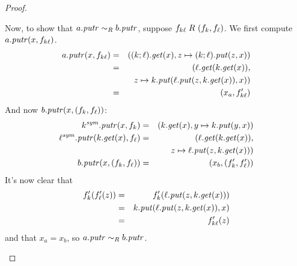 \begin{defn}[$R$-similarity]
\begin{theorem}
\begin{lemma}
\begin{theorem}[No products]
\begin{lemma}
\begin{defn}
\begin{theorem}
\begin{theorem}
\begin{corollary}[Hylomorphism]
\begin{defn}
\begin{defn}
\begin{defn}[Symmetrization]
\begin{proof}
\begin{longenum}
Now, to show that $a.\mathit{putr} \sim_R b.\mathit{putr}$, suppose
$f_{k\ell}\mathrel{R_{}}(f_k,f_\ell)$. We first compute $a.\mathit{putr}(x,f_{k\ell})$.
\begin{eqnarray*}
    a.\mathit{putr}(x,f_{k\ell}) &=& ((k;\ell).\mathit{get}(x),z \mapsto (k;\ell).\mathit{put}(z,x)) \\
    &=& (\ell.\mathit{get}(k.\mathit{get}(x)), \\
    & & z \mapsto k.\mathit{put}(\ell.\mathit{put}(z,k.\mathit{get}(x)),x)) \\
    &=& (x_a,f_{k\ell}')
\end{eqnarray*}
And now $b.\mathit{putr}(x,(f_k,f_\ell))$:
\begin{eqnarray*}
    k^\mathit{sym}.\mathit{putr}(x,f_k) &=& (k.\mathit{get}(x),y \mapsto k.\mathit{put}(y,x)) \\
    \ell^\mathit{sym}.\mathit{putr}(k.\mathit{get}(x),f_\ell) &=& (\ell.\mathit{get}(k.\mathit{get}(x)), \\
    & & z \mapsto \ell.\mathit{put}(z,k.\mathit{get}(x))) \\
    b.\mathit{putr}(x,(f_k,f_\ell)) &=& (x_b,(f_k',f_\ell'))
\end{eqnarray*}
It's now clear that
\begin{eqnarray*}
    f_k'(f_\ell'(z)) &=& f_k'(\ell.\mathit{put}(z,k.\mathit{get}(x))) \\
    &=& k.\mathit{put}(\ell.\mathit{put}(z,k.\mathit{get}(x)),x) \\
    &=& f_{k\ell}'(z)
\end{eqnarray*}
and that $x_a=x_b$, so $a.\mathit{putr} \sim_R b.\mathit{putr}$.


\end{longenum}
\end{proof}
\end{defn}
\end{defn}
\end{defn}
\end{corollary}
\end{theorem}
\end{theorem}
\end{defn}
\end{lemma}
\end{theorem}
\end{lemma}
\end{theorem}
\end{defn}
